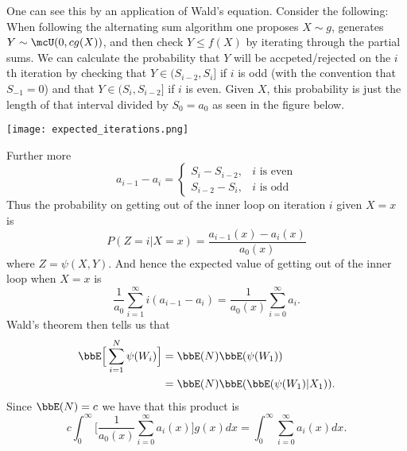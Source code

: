 \documentclass[draft]{article}
\begin{document}
One can see this by an application of Wald's equation.  Consider the following:
When following the alternating sum algorithm one proposes $X \sim g$, generates
$Y \sim \mcU(0, cg(X))$, and then check $Y \leq f(X)$ by iterating through the
partial sums.  We can calculate the probability that $Y$ will be
accpeted/rejected on the $i$th iteration by checking that $Y \in (S_{i-2}, S_i]$
if $i$ is odd (with the convention that $S_{-1} = 0$) and that $Y
\in (S_i, S_{i-2}]$ if $i$ is even.  Given $X$, this probability is just the
length of that interval divided by $S_0 = a_0$ as seen in the figure below.
\begin{center}
\texttt{[image: expected\_iterations.png]}
\end{center}
Further more
\[
a_{i-1} - a_{i} = 
\begin{cases}
S_{i} - S_{i-2}, & \text{$i$ is even} \\
S_{i-2} - S_i, & \text{$i$ is odd}
\end{cases}
\]
Thus the probability on getting out of the inner loop on iteration $i$ given $X=x$
is
\[
P(Z = i | X = x) = \frac{a_{i-1}(x) - a_i(x)}{a_0(x)}
\]
where $Z = \psi(X, Y)$.  And hence the expected value of
getting out of the inner loop when $X=x$ is
\[
\frac{1}{a_0} \sum_{i=1}^\infty i (a_{i-1} - a_i) = \frac{1}{a_0(x)}
\sum_{i=0}^\infty a_i.
\]
Wald's theorem then tells us that
\begin{align*}
\bbE \Big[ \sum_{i=1}^N \psi(W_i) \Big] 
& = \bbE(N) \bbE(\psi(W_1)) \\
& = \bbE(N) \bbE( \bbE(\psi(W_1)|X_1) ).
\end{align*}
Since $\bbE(N) = c$ we have that this product is
\[
c \int_{0}^\infty \Big[ \frac{1}{a_0(x)} \sum_{i=0}^\infty a_i(x) \Big] g(x) dx
= \int_{0}^\infty \sum_{i=0}^\infty a_i(x) dx.
\]
\end{document}
